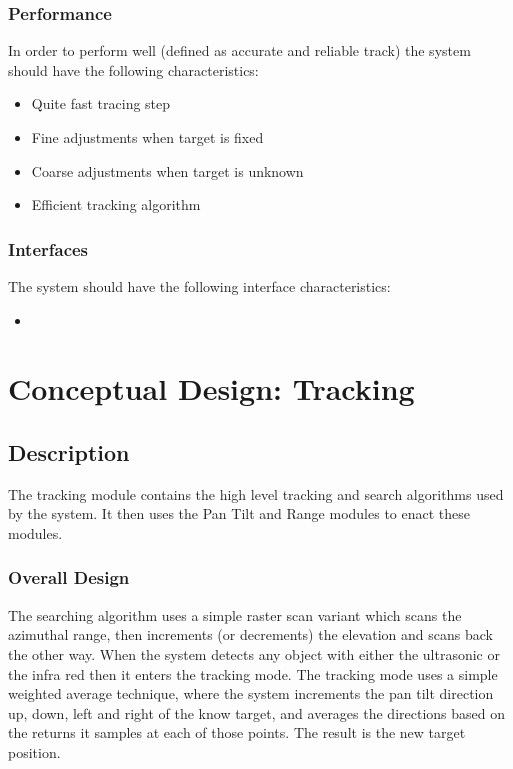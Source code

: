 \documentclass[]{report}
\begin{document}
\subsubsection{Performance}
In order to perform well (defined as accurate and reliable track) the system should have the following characteristics:
\begin{itemize}
	\item Quite fast tracing step
	\item Fine adjustments when target is fixed
	\item Coarse adjustments when target is unknown
	\item Efficient tracking algorithm
\end{itemize}

\subsubsection{Interfaces}
The system should have the following interface characteristics:
\begin{itemize}
	\item 
\end{itemize}

\section{Conceptual Design: Tracking}
\subsection{Description}
The tracking module contains the high level tracking and search algorithms used by the system. It then uses the Pan Tilt and Range modules to enact these modules.

\subsubsection{Overall Design}
The searching algorithm uses a simple raster scan variant which scans the azimuthal range, then increments (or decrements) the elevation and scans back the other way. When the system detects any object with either the ultrasonic or the infra red then it enters the tracking mode. \newline
The tracking mode uses a simple weighted average technique, where the system increments the pan tilt direction up, down, left and right of the know target, and averages the directions based on the returns it samples at each of those points. The result is the new target position.
\end{document}
